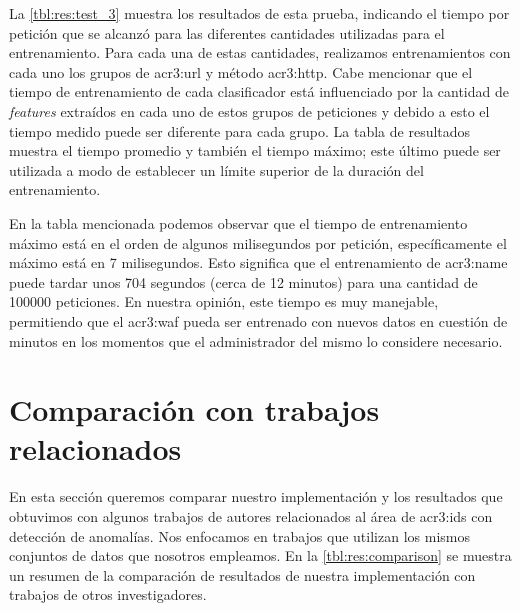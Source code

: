 La \autoref{tbl:res:test_3} muestra los resultados de esta prueba, indicando
el tiempo por petición que se alcanzó para las diferentes cantidades
utilizadas para el entrenamiento. Para cada una de estas cantidades,
realizamos entrenamientos con cada uno los grupos de \gls{acr3:url} y
método \gls{acr3:http}.
Cabe mencionar que el tiempo de entrenamiento de cada clasificador está
influenciado por la cantidad de \textit{features} extraídos en cada uno
de estos grupos de peticiones y debido a esto el tiempo medido puede ser
diferente para cada grupo. La tabla de resultados muestra el tiempo
promedio y también el tiempo máximo; este último puede ser utilizada a
modo de establecer un límite superior de la duración del entrenamiento.

En la tabla mencionada podemos observar que el tiempo de entrenamiento
máximo está en el orden de algunos milisegundos por petición, específicamente
el máximo está en 7 milisegundos. Esto significa que el entrenamiento
de \gls{acr3:name} puede tardar unos 704 segundos (cerca de 12 minutos)
para una cantidad de \num{100000} peticiones.
En nuestra opinión, este tiempo es muy manejable, permitiendo que el
\gls{acr3:waf} pueda ser entrenado con nuevos datos en cuestión de
minutos en los momentos que el administrador del mismo lo considere
necesario.


\section{Comparación con trabajos relacionados}

En esta sección queremos comparar nuestro implementación y los resultados
que obtuvimos con algunos trabajos de autores relacionados al área de
\gls{acr3:ids} con detección de anomalías. Nos enfocamos en trabajos que
utilizan los mismos conjuntos de datos que nosotros empleamos. En la
\autoref{tbl:res:comparison} se muestra un resumen de la comparación de
resultados de nuestra implementación con trabajos de otros investigadores.

